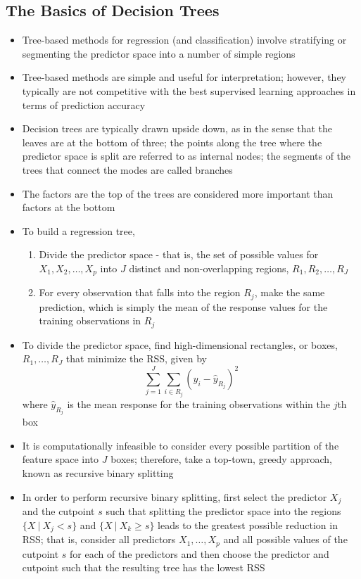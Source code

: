 \documentclass[12pt]{article}
\begin{document}
\subsection{The Basics of Decision Trees}
\begin{itemize} 
\item Tree-based methods for regression (and classification) involve stratifying or segmenting the predictor space into a number of simple regions 
\item Tree-based methods are simple and useful for interpretation; however, they typically are not competitive with the best supervised learning approaches in terms of prediction accuracy 
\item Decision trees are typically drawn upside down, as in the sense that the leaves are at the bottom of three; the points along the tree where the predictor space is split are referred to as internal nodes; the segments of the trees that connect the modes are called branches 
\item The factors are the top of the trees are considered more important than factors at the bottom 
\item To build a regression tree, \begin{enumerate} 
\item Divide the predictor space - that is, the set of possible values for $X_1,X_2,\dots,X_p$ into $J$ distinct and non-overlapping regions, $R_1,R_2,\dots,R_J$
\item For every observation that falls into the region $R_j$, make the same prediction, which is simply the mean of the response values for the training observations in $R_j$ \end{enumerate} 
\item To divide the predictor space, find high-dimensional rectangles, or boxes, $R_1,\dots,R_J$ that minimize the RSS, given by $$ \sum_{j=1}^J \sum_{i \in R_j} (y_i - \hat{y}_{R_j})^2 $$ where $\hat{y}_{R_j}$ is the mean response for the training observations within the $j$th box 
\item It is computationally infeasible to consider every possible partition of the feature space into $J$ boxes; therefore, take a top-town, greedy approach, known as recursive binary splitting 
\item In order to perform recursive binary splitting, first select the predictor $X_j$ and the cutpoint $s$ such that splitting the predictor space into the regions $\{X~|~X_j  < s\}$ and $\{X~|~X_k \geq s\}$ leads to the greatest possible reduction in RSS; that is, consider all predictors $X_1,\dots,X_p$ and all possible values of the cutpoint $s$ for each of the predictors and then choose the predictor and cutpoint such that the resulting tree has the lowest RSS 

\end{itemize}
\end{document}
